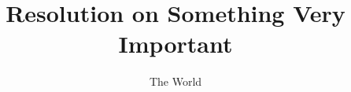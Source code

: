 \documentclass{munresolution}
\title{Resolution on Something Very Important}
\author{The World}
\begin{document}
\renewcommand{\UNtopic}{Very Important Things}
\renewcommand{\UNcommittee}{Committee on Important Things}

\maketitle

\begin{UNbody}
\begin{preamb}
  \preambclause[Concerned by]{\blindtext[1]}
\end{preamb}

\begin{operatives}
  \operativeclause[Urges]{\blindtext[1]}
  \operativeclauselast[Requests]{\blindtext[1]}
\end{operatives}
\end{UNbody}
\UNendbar
\end{document}
